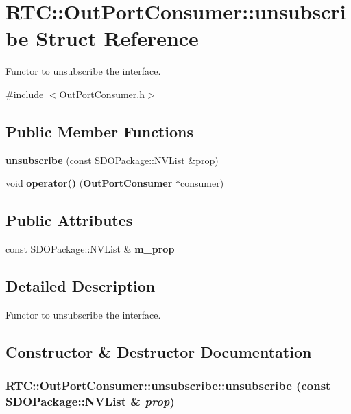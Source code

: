 \section{RTC::OutPortConsumer::unsubscribe Struct Reference}
\label{structRTC_1_1OutPortConsumer_1_1unsubscribe}


Functor to unsubscribe the interface.  




{\ttfamily \#include $<$OutPortConsumer.h$>$}

\subsection*{Public Member Functions}
\begin{DoxyCompactItemize}
\item 
{\bf unsubscribe} (const SDOPackage::NVList \&prop)
\item 
void {\bf operator()} ({\bf OutPortConsumer} $\ast$consumer)
\end{DoxyCompactItemize}
\subsection*{Public Attributes}
\begin{DoxyCompactItemize}
\item 
const SDOPackage::NVList \& {\bf m\_\-prop}
\end{DoxyCompactItemize}


\subsection{Detailed Description}
Functor to unsubscribe the interface. 

\subsection{Constructor \& Destructor Documentation}
\subsubsection[{unsubscribe}]{\setlength{\rightskip}{0pt plus 5cm}RTC::OutPortConsumer::unsubscribe::unsubscribe (const SDOPackage::NVList \& {\em prop})\hspace{0.3cm}{\ttfamily  [inline]}}\label{structRTC_1_1OutPortConsumer_1_1unsubscribe_a25c120067765e6861ef00ea762916e1f}


